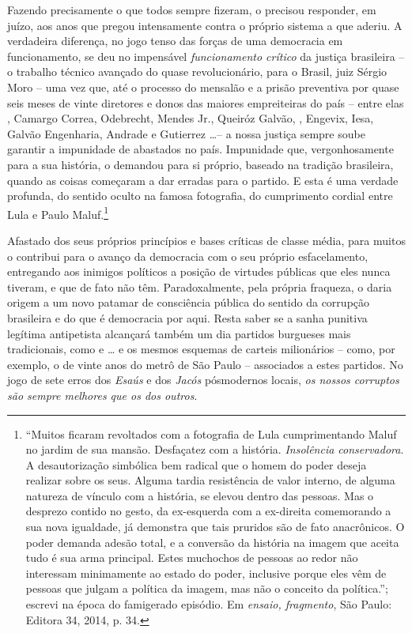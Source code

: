 Fazendo precisamente o que todos sempre fizeram, o  precisou
responder, em juízo, aos anos que pregou intensamente contra o próprio
sistema a que aderiu. A verdadeira diferença, no jogo tenso das forças
de uma democracia em funcionamento, se deu no impensável
\emph{funcionamento crítico} da justiça brasileira -- o trabalho técnico
avançado do quase revolucionário, para o Brasil, juiz Sérgio Moro -- uma
vez que, até o processo do mensalão e a prisão preventiva por quase seis
meses de vinte diretores e donos das maiores empreiteiras do país -- entre
elas , Camargo Correa, Odebrecht, Mendes Jr., Queiróz Galvão, ,
Engevix, Iesa, Galvão Engenharia, Andrade e Gutierrez
…-- a nossa justiça sempre soube garantir a impunidade de abastados no
país. Impunidade que, vergonhosamente para a sua história, o  demandou
para si próprio, baseado na tradição brasileira, quando as coisas
começaram a dar erradas para o partido. E esta é uma verdade profunda,
do sentido oculto na famosa fotografia, do cumprimento cordial entre
Lula e Paulo Maluf.\footnote{``Muitos ficaram revoltados com a
  fotografia de Lula cumprimentando Maluf no jardim de sua mansão.
  Desfaçatez com a história. \emph{Insolência conservadora}. A
  desautorização simbólica bem radical que o homem do poder deseja
  realizar sobre os seus. Alguma tardia resistência de valor interno, de
  alguma natureza de vínculo com a história, se elevou dentro das
  pessoas. Mas o desprezo contido no gesto, da ex-esquerda com a
  ex-direita comemorando a sua nova igualdade, já demonstra que tais
  pruridos são de fato anacrônicos. O poder demanda adesão total, e a
  conversão da história na imagem que aceita tudo é sua arma principal.
  Estes muchochos de pessoas ao redor não interessam minimamente ao
  estado do poder, inclusive porque eles vêm de pessoas que julgam a
  política da imagem, mas não o conceito da política.''; escrevi na
  época do famigerado episódio. Em \emph{ensaio, fragmento}, São Paulo:
  Editora 34, 2014, p. 34.}

Afastado dos seus próprios princípios e bases críticas de classe média,
para muitos o  contribui para o avanço da democracia com o seu próprio
esfacelamento, entregando aos inimigos políticos a posição de virtudes
públicas que eles nunca tiveram, e que de fato não têm. Paradoxalmente,
pela própria fraqueza, o  daria origem a um novo patamar de
consciência pública do sentido da corrupção brasileira e do que é
democracia por aqui. Resta saber se a sanha punitiva legítima
antipetista alcançará também um dia partidos burgueses mais
tradicionais, como  e … e os mesmos esquemas de carteis
milionários -- como, por exemplo, o de vinte anos do metrô de São Paulo
-- associados a estes partidos. No jogo de sete erros dos \emph{Esaús} e
dos \emph{Jacós} pósmodernos locais, \emph{os nossos corruptos são
sempre melhores que os dos outros}.

